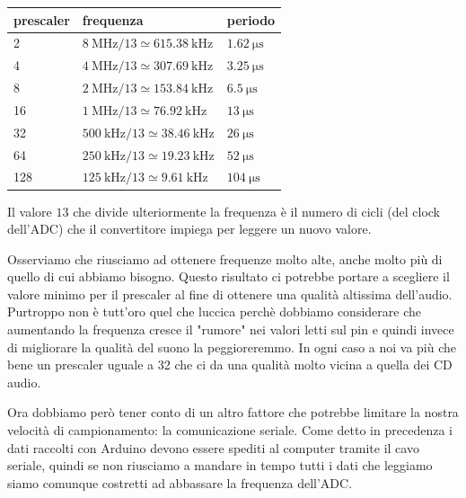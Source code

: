 \documentclass[a4paper,11pt]{article}
\begin{document}
\begin{table}[h]
\centering
\begin{tabular}{|l|l|l|}
\hline
\textbf{prescaler} & \textbf{frequenza} & \textbf{periodo} \\ \hline \hline
2 & $\SI{8}{\mega\hertz} / 13 \simeq \SI{615.38}{\kilo\hertz}$ & $\SI{1.62}{\micro\second}$\\ \hline
4 & $\SI{4}{\mega\hertz} / 13 \simeq \SI{307.69}{\kilo\hertz}$ & $\SI{3.25}{\micro\second}$\\ \hline
8 & $\SI{2}{\mega\hertz} / 13 \simeq \SI{153.84}{\kilo\hertz}$ & $\SI{6.5}{\micro\second}$\\ \hline
16 & $\SI{1}{\mega\hertz} / 13 \simeq \SI{76.92}{\kilo\hertz}$ & $\SI{13}{\micro\second}$\\ \hline
32 & $\SI{500}{\kilo\hertz} / 13 \simeq \SI{38.46}{\kilo\hertz}$ & $\SI{26}{\micro\second}$\\ \hline
64 & $\SI{250}{\kilo\hertz} / 13 \simeq \SI{19.23}{\kilo\hertz}$ & $\SI{52}{\micro\second}$\\ \hline
128 & $\SI{125}{\kilo\hertz} / 13 \simeq \SI{9.61}{\kilo\hertz}$ & $\SI{104}{\micro\second}$\\  \hline
\end{tabular}
\end{table}

Il valore $13$ che divide ulteriormente la frequenza è il numero di cicli (del clock dell'ADC) che il convertitore impiega per leggere un nuovo valore.

Osserviamo che riusciamo ad ottenere frequenze molto alte, anche molto più di quello di cui abbiamo bisogno. Questo risultato ci potrebbe portare a scegliere il valore minimo per il prescaler al fine di ottenere una qualità altissima dell'audio. Purtroppo non è tutt'oro quel che luccica perchè dobbiamo considerare che aumentando la frequenza cresce il "rumore" nei valori letti sul pin e quindi invece di migliorare la qualità del suono la peggioreremmo. In ogni caso a noi va più che bene un prescaler uguale a 32 che ci da una qualità molto vicina a quella dei CD audio.

Ora dobbiamo però tener conto di un altro fattore che potrebbe limitare la nostra velocità di campionamento: la comunicazione seriale.
Come detto in precedenza i dati raccolti con Arduino devono essere spediti al computer tramite il cavo seriale, quindi se non riusciamo a mandare in tempo tutti i dati che leggiamo siamo comunque costretti ad abbassare la frequenza dell'ADC.
\end{document}
